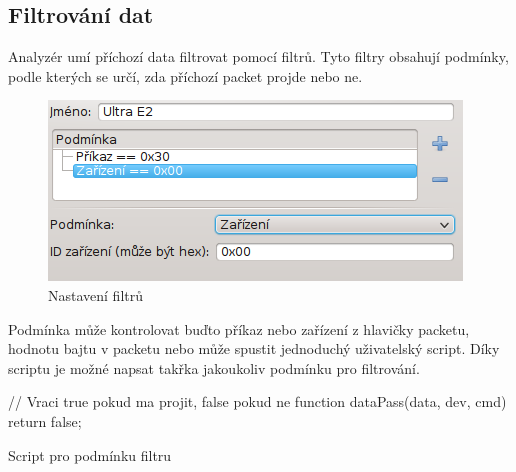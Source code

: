 \documentclass[12pt, a4paper, oneside]{article}
\begin{document}
\subsection{Filtrování dat}
Analyzér umí příchozí data filtrovat pomocí filtrů. Tyto filtry obsahují podmínky, podle kterých se určí, zda příchozí packet projde nebo ne.
\begin{figure}[H]
\begin{center}
\includegraphics[scale=1]{img/filters.png}
\caption{Nastavení filtrů}
\end{center}
\end{figure}
Podmínka může kontrolovat buďto příkaz nebo zařízení z hlavičky packetu, hodnotu bajtu v packetu nebo může spustit jednoduchý uživatelský script. Díky scriptu je možné napsat takřka jakoukoliv podmínku pro filtrování.

\begin{listing}[H]
\begin{jscode}
// Vraci true pokud ma projit, false pokud ne
function dataPass(data, dev, cmd) {
    return false;
}
\end{jscode}
\caption{Script pro podmínku filtru}
\end{listing}

\end{document}
